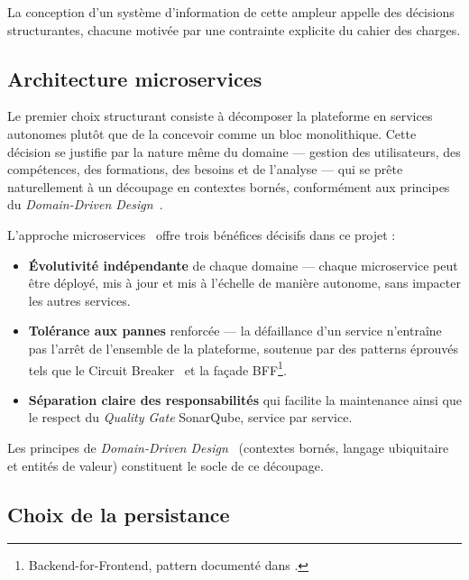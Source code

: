 \documentclass[12pt,a4paper]{report}
\begin{document}
La conception d'un système d'information de cette ampleur appelle des
décisions structurantes, chacune motivée par une contrainte explicite du
cahier des charges.

\subsection{Architecture microservices}

Le premier choix structurant consiste à décomposer la plateforme en services
autonomes plutôt que de la concevoir comme un bloc monolithique. Cette
décision se justifie par la nature même du domaine --- gestion des
utilisateurs, des compétences, des formations, des besoins et de l'analyse
--- qui se prête naturellement à un découpage en contextes bornés,
conformément aux principes du \textit{Domain-Driven
Design}~\cite{evans2003ddd}.

L'approche
microservices~\cite{newman2021microservices,richson2018microservices}
offre trois bénéfices décisifs dans ce projet :

\begin{itemize}[leftmargin=1.2cm, itemsep=6pt]
  \item \textbf{Évolutivité indépendante} de chaque domaine --- chaque
  microservice peut être déployé, mis à jour et mis à l'échelle de manière
  autonome, sans impacter les autres services.

  \item \textbf{Tolérance aux pannes} renforcée --- la défaillance d'un
  service n'entraîne pas l'arrêt de l'ensemble de la plateforme,
  soutenue par des patterns éprouvés tels que le Circuit
  Breaker~\cite{richson2018microservices} et la façade
  BFF\footnote{Backend-for-Frontend, pattern documenté dans
  \cite{richson2018microservices}.}.

  \item \textbf{Séparation claire des responsabilités} qui facilite la
  maintenance ainsi que le respect du \emph{Quality Gate} SonarQube,
  service par service.
\end{itemize}

Les principes de \textit{Domain-Driven
Design}~\cite{evans2003ddd,martin2003ddd} (contextes bornés, langage
ubiquitaire et entités de valeur) constituent le socle de ce découpage.

\subsection{Choix de la persistance}
\end{document}

